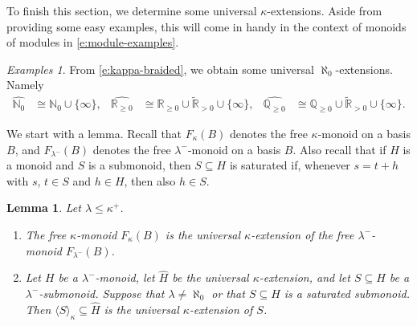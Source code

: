 \documentclass[a4paper,11pt,oneside]{amsart}
\newtheorem{lemma}[teor]{Lemma}
\theoremstyle{remark}
\newtheorem{examples}[teor]{Examples}
\newcommand{\defit}[1]{\textsf{#1}}
\newcommand{\bN}{\mathbb N}
\newcommand{\bQ}{\mathbb Q}
\newcommand{\bR}{\mathbb R}
\begin{document}
To finish this section, we determine some universal $\kappa$-extensions.
Aside from providing some easy examples, this will come in handy in the context of monoids of modules in \cref{e:module-examples}.

\begin{examples} \label{e:univ-kappa-ext}
  From \cref{e:kappa-braided}, we obtain some universal $\aleph_0$-extensions.
  Namely
  \begin{align*}
    \widehat{\bN_0} &\cong \bN_0 \cup \{\infty\},
    & \widehat{\bR_{\ge 0}} &\cong \bR_{\ge 0} \cup \widetilde{\bR}_{>0} \cup \{\infty\},
    & \widehat{\bQ_{\ge 0}} &\cong \bQ_{\ge 0} \cup \widetilde{\bR}_{>0} \cup \{\infty\}.
  \end{align*}
\end{examples}

We start with a lemma. Recall that $F_{\kappa}(B)$ denotes the free $\kappa$-monoid on a basis $B$, and $F_{\lambda^-}(B)$ denotes the free $\lambda^-$-monoid on a basis $B$.
Also recall that if $H$ is a monoid and $S$ is a submonoid, then $S \subseteq H$ is \defit{saturated} if, whenever $s=t+h$ with $s$, $t \in S$ and $h \in H$, then also $h \in S$.

\begin{lemma} \label{l:ext-basic}
  Let $\lambda \le \kappa^+$.
  \begin{enumerate}
  \item \label{ext-basic:free} The free $\kappa$-monoid $F_\kappa(B)$ is the universal $\kappa$-extension of the free $\lambda^{-}$-monoid $F_{\lambda^-}(B)$.
  \item \label{ext-basic:sub}
    Let $H$ be a $\lambda^-$-monoid, let $\widehat H$ be the universal $\kappa$-extension, and let $S \subseteq H$ be a $\lambda^-$-submonoid.
    Suppose that $\lambda \ne \aleph_0$ or that $S \subseteq H$ is a saturated submonoid.
    Then $\langle S \rangle_{\kappa} \subseteq \widehat H$ is the universal $\kappa$-extension of $S$.
  \end{enumerate}
\end{lemma}
\end{document}

